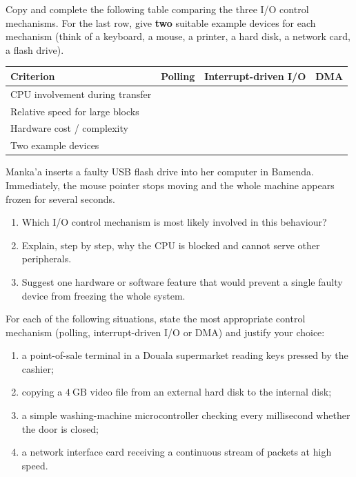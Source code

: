 \documentclass[11pt]{article}
\begin{document}
\begin{exercice}
Copy and complete the following table comparing the three I/O control mechanisms. For the last row, give \textbf{two} suitable example devices for each mechanism (think of a keyboard, a mouse, a printer, a hard disk, a network card, a flash drive).
\begin{center}
\begin{tabularx}{\linewidth}{|l|X|X|X|}
\hline
\rowcolor{popblueL} \textbf{Criterion} & \textbf{Polling} & \textbf{Interrupt-driven I/O} & \textbf{DMA} \\
\hline CPU involvement during transfer & & & \\
\hline Relative speed for large blocks & & & \\
\hline Hardware cost / complexity & & & \\
\hline Two example devices & & & \\
\hline
\end{tabularx}
\end{center}
\end{exercice}

\begin{exercice}
Manka'a inserts a faulty USB flash drive into her computer in Bamenda. Immediately, the mouse pointer stops moving and the whole machine appears frozen for several seconds.
\begin{enumerate}
\item Which I/O control mechanism is most likely involved in this behaviour?
\item Explain, step by step, why the CPU is blocked and cannot serve other peripherals.
\item Suggest one hardware or software feature that would prevent a single faulty device from freezing the whole system.
\end{enumerate}
\end{exercice}

\begin{exercice}
For each of the following situations, state the most appropriate control mechanism (polling, interrupt-driven I/O or DMA) and justify your choice:
\begin{enumerate}
\item a point-of-sale terminal in a Douala supermarket reading keys pressed by the cashier;
\item copying a $4\ \mathrm{GB}$ video file from an external hard disk to the internal disk;
\item a simple washing-machine microcontroller checking every millisecond whether the door is closed;
\item a network interface card receiving a continuous stream of packets at high speed.
\end{enumerate}
\end{exercice}
\end{document}
